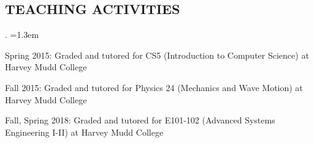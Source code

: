 \documentclass[]{res}
\begin{document}
\begin{resume}
\section{TEACHING ACTIVITIES}
\begin{list}{.}
  {\leftmargin=1.3em}
\item Spring 2015: Graded and tutored for CS5 (Introduction to Computer Science) at Harvey Mudd College
\item Fall 2015: Graded and tutored for Physics 24 (Mechanics and Wave Motion) at Harvey Mudd College
\item Fall, Spring 2018: Graded and tutored for E101-102 (Advanced Systems Engineering I-II) at Harvey Mudd College
\end{list}



\end{resume}
\end{document}

